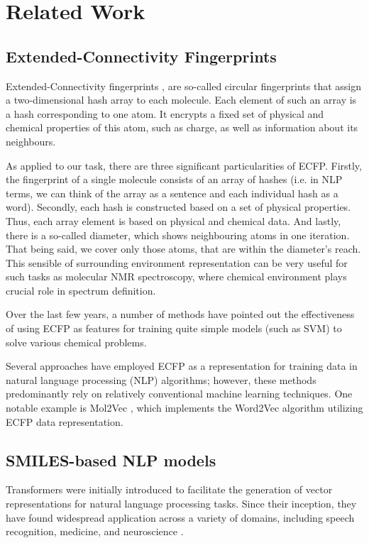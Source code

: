 \section{Related Work}
\subsection{Extended-Connectivity Fingerprints}

Extended-Connectivity fingerprints \citep{ECFP}, are so-called circular fingerprints that assign a two-dimensional hash array to each molecule. Each element of such an array is a hash corresponding to one atom. It encrypts a fixed set of physical and chemical properties of this atom, such as charge, as well as information about its neighbours.


As applied to our task, there are three significant particularities of ECFP. Firstly, the fingerprint of a single molecule consists of an array of hashes (i.e. in NLP terms, we can think of the array as a sentence and each individual hash as a word). Secondly, each hash is constructed based on a set of physical properties. Thus, each array element is based on physical and chemical data. And lastly, there is a so-called diameter, which shows neighbouring atoms in one iteration. That being said, we cover only those atoms, that are within the diameter's reach. This sensible of surrounding environment representation can be very useful for such tasks as molecular NMR spectroscopy, where chemical environment plays crucial role in spectrum definition.

Over the last few years, a number of methods \citep{fp2, fp_ml} have pointed out the effectiveness of using ECFP as features for training quite simple models (such as SVM) to solve various chemical problems. 

Several approaches have employed ECFP as a representation for training data in natural language processing (NLP) algorithms; however, these methods predominantly rely on relatively conventional machine learning techniques. One notable example is Mol2Vec \citep{mol2vec}, which implements the Word2Vec algorithm utilizing ECFP data representation.

\subsection{SMILES-based NLP models}

Transformers \citep{transformers} were initially introduced to facilitate the generation of vector representations for natural language processing tasks. Since their inception, they have found widespread application across a variety of domains, including speech recognition, medicine, and neuroscience \citep{SHAMSHAD2023102802, cong2024comprehensive}. 

